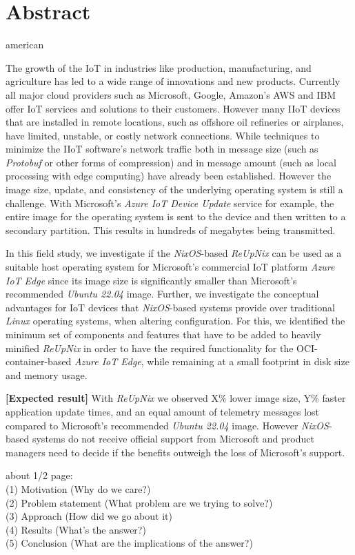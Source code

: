 \chapter*{Abstract}
\begin{otherlanguage*}{american}

The growth of the \ac{IoT} in industries like production, manufacturing, and agriculture has led to a
wide range of innovations and new products. Currently all major cloud providers such as Microsoft, Google,
Amazon's AWS and IBM offer \ac{IoT} services and solutions to their customers.
However many \ac{IIoT} devices that are installed in remote locations, such as offshore oil
refineries or airplanes, have limited, unstable, or costly network connections. While techniques to minimize the \ac{IIoT} software’s
network traffic both in message size (such as \textit{Protobuf} or other forms of compression) and in
message amount (such as local processing with edge computing) have already been established. However the image size,
update, and consistency of the underlying operating system is still a challenge. With Microsoft's \textit{Azure IoT Device
Update} service for example, the entire image for the operating system is sent to the device and then
written to a secondary partition. This results in hundreds of megabytes being transmitted.

In this field study, we investigate if the \textit{NixOS}-based \textit{ReUpNix} can be used as a suitable host operating
system for Microsoft’s commercial \ac{IoT} platform \textit{Azure IoT Edge} since its image size is significantly smaller
than Microsoft's recommended \textit{Ubuntu 22.04} image. Further, we investigate the conceptual advantages for \ac{IoT}
devices that \textit{NixOS}-based systems provide over traditional \textit{Linux} operating systems, when altering configuration.
For this, we identified the minimum set
of components and features that have to be added to heavily minified \textit{ReUpNix} in order to have the required
functionality
for the OCI-container-based \textit{Azure IoT Edge}, while remaining at a small footprint in disk size and memory
usage.

\textbf{[Expected result]}
With \textit{ReUpNix} we observed X\% lower image size, Y\% faster application update times, and
an equal amount of telemetry messages lost compared to Microsoft’s recommended \textit{Ubuntu 22.04}
image. However \textit{NixOS}-based systems do not receive official support from Microsoft and product
managers need to
decide if the benefits outweigh the loss of Microsoft's support.



about 1/2 page:   \\
(1) Motivation (Why do we care?)   \\
(2) Problem statement (What problem are we trying to solve?)   \\
(3) Approach (How did we go about it)   \\
(4) Results (What's the answer?)   \\
(5) Conclusion (What are the implications of the answer?)\\


\end{otherlanguage*}


